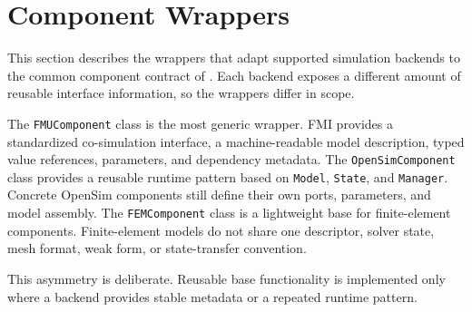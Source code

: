 \section{Component Wrappers}
\label{sec:impl_wrappers}

This section describes the wrappers that adapt supported simulation backends to the common component contract of \syssimx{}.
Each backend exposes a different amount of reusable interface information, so the wrappers differ in scope.

The \texttt{FMUComponent} class is the most generic wrapper.
\ac{FMI} provides a standardized co-simulation interface, a machine-readable model description, typed value references, parameters, and dependency metadata.
The \texttt{OpenSimComponent} class provides a reusable runtime pattern based on \texttt{Model}, \texttt{State}, and \texttt{Manager}.
Concrete OpenSim components still define their own ports, parameters, and model assembly.
The \texttt{FEMComponent} class is a lightweight base for finite-element components.
Finite-element models do not share one descriptor, solver state, mesh format, weak form, or state-transfer convention.

This asymmetry is deliberate.
Reusable base functionality is implemented only where a backend provides stable metadata or a repeated runtime pattern.




